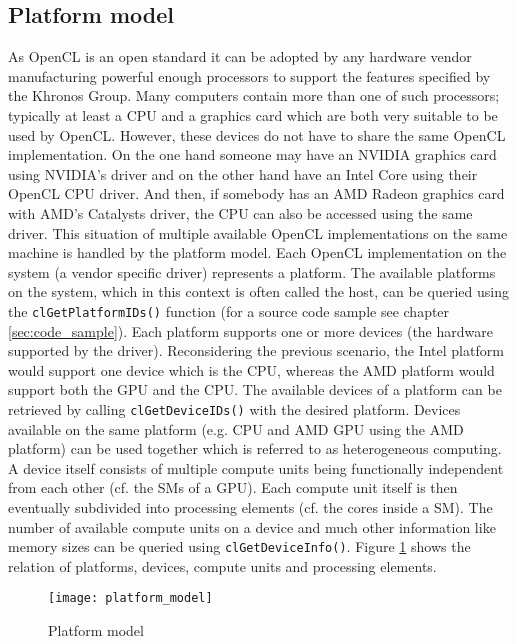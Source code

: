 \subsection{Platform model}
As OpenCL is an open standard it can be adopted by any hardware vendor manufacturing powerful enough processors to support the features specified by the Khronos Group. Many computers contain more than one of such processors; typically at least a CPU and a graphics card which are both very suitable to be used by OpenCL. However, these devices do not have to share the same OpenCL implementation. On the one hand someone may have an NVIDIA graphics card using NVIDIA's driver and on the other hand have an Intel Core using their OpenCL CPU driver. And then, if somebody has an AMD Radeon graphics card with AMD's Catalysts driver, the CPU can also be accessed using the same driver.
This situation of multiple available OpenCL implementations on the same machine is handled by the platform model. Each OpenCL implementation on the system (a vendor specific driver) represents a platform. The available platforms on the system, which in this context is often called the host, can be queried using the \lstinline!clGetPlatformIDs()! function (for a source code sample see chapter \ref{sec:code_sample}).
Each platform supports one or more devices (the hardware supported by the driver). Reconsidering the previous scenario, the Intel platform would support one device which is the CPU, whereas the AMD platform would support both the GPU and the CPU. The available devices of a platform can be retrieved by calling \lstinline!clGetDeviceIDs()! with the desired platform. Devices available on the same platform (e.g. CPU and AMD GPU using the AMD platform) can be used together which is referred to as heterogeneous computing. 
A device itself consists of multiple compute units being functionally independent from each other (cf. the SMs of a GPU). Each compute unit itself is then eventually subdivided into processing elements (cf. the cores inside a SM). The number of available compute units on a device and much other information like memory sizes can be queried using \lstinline!clGetDeviceInfo()!.
Figure \ref{fig:platform_model} shows the relation of platforms, devices, compute units and processing elements. \cite[p.19ff]{opencl_book}

\begin{figure} 
\centering
\texttt{[image: platform\_model]}
\caption{Platform model}
\label{fig:platform_model}
\end{figure}

